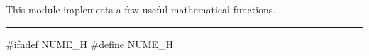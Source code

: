 % 
% 
% 
% 


This module implements a few useful mathematical functions.

\bigskip\hrule
\code\hide
#ifndef NUME_H
#define NUME_H
\endhide

